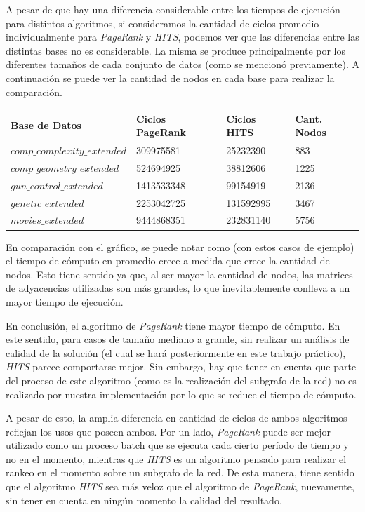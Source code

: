 	\par 

A pesar de que hay una diferencia considerable entre los tiempos de ejecución para distintos algoritmos, si consideramos la cantidad de ciclos promedio individualmente para \textit{PageRank} y \textit{HITS}, podemos ver que las diferencias entre las distintas bases no es considerable. La misma se produce principalmente por los diferentes tamaños de cada conjunto de datos (como se mencionó previamente). 
A continuación se puede ver la cantidad de nodos en cada base para realizar la comparación. 

\begin{center}
    \begin{tabular}{| l | l | l | l |}
    \hline
    Base de Datos & Ciclos PageRank & Ciclos HITS & Cant. Nodos \\ \hline
    $comp\_complexity\_extended$ & 309975581 & 25232390 & 883 \\ \hline
    $comp\_geometry\_extended$ & 524694925 & 38812606 & 1225 \\ \hline
	$gun\_control\_extended$ & 1413533348 & 99154919 & 2136 \\ \hline
	$genetic\_extended$ & 2253042725 & 131592995 & 3467 \\ \hline
	$movies\_extended$ & 9444868351 & 232831140	& 5756 \\ \hline
    \end{tabular}
\end{center}

En comparación con el gráfico, se puede notar como (con estos casos de ejemplo) el tiempo de cómputo en promedio crece a medida que crece la cantidad de nodos. Esto tiene sentido ya que, al ser mayor la cantidad de nodos, las matrices de adyacencias utilizadas son más grandes, lo que inevitablemente conlleva a un mayor tiempo de ejecución.

\par 

En conclusión, el algoritmo de \textit{PageRank} tiene mayor tiempo de cómputo. En este sentido, para casos de tamaño mediano a grande, sin realizar un análisis de calidad de la solución (el cual se hará posteriormente en este trabajo práctico), \textit{HITS} parece comportarse mejor. Sin embargo, hay que tener en cuenta que parte del proceso de este algoritmo (como es la realización del subgrafo de la red) no es realizado por nuestra implementación por lo que se reduce el tiempo de cómputo. 
\par A pesar de esto, la amplia diferencia en cantidad de ciclos de ambos algoritmos reflejan los usos que poseen ambos. Por un lado, \textit{PageRank} puede ser mejor utilizado como un proceso batch que se ejecuta cada cierto período de tiempo y no en el momento, mientras que \textit{HITS} es un algoritmo pensado para realizar el rankeo en el momento sobre un subgrafo de la red. De esta manera, tiene sentido que el algoritmo \textit{HITS} sea más veloz que el algoritmo de \textit{PageRank}, nuevamente, sin tener en cuenta en ningún momento la calidad del resultado.




